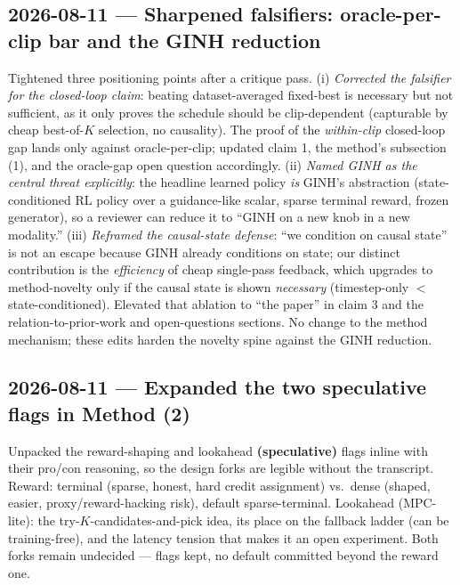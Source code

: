 \documentclass{article}
\begin{document}
\subsection*{2026-08-11 --- Sharpened falsifiers: oracle-per-clip bar and the GINH reduction}
Tightened three positioning points after a critique pass. (i) \emph{Corrected the falsifier for
the closed-loop claim}: beating dataset-averaged fixed-best is necessary but not sufficient, as
it only proves the schedule should be clip-dependent (capturable by cheap best-of-$K$ selection,
no causality). The proof of the \emph{within-clip} closed-loop gap lands only against
oracle-per-clip; updated claim 1, the method's subsection (1), and the oracle-gap open question
accordingly. (ii) \emph{Named GINH as the central threat explicitly}: the headline learned policy
\emph{is} GINH's abstraction (state-conditioned RL policy over a guidance-like scalar, sparse
terminal reward, frozen generator), so a reviewer can reduce it to ``GINH on a new knob in a new
modality.'' (iii) \emph{Reframed the causal-state defense}: ``we condition on causal state'' is
not an escape because GINH already conditions on state; our distinct contribution is the
\emph{efficiency} of cheap single-pass feedback, which upgrades to method-novelty only if the
causal state is shown \emph{necessary} (timestep-only $<$ state-conditioned). Elevated that
ablation to ``the paper'' in claim 3 and the relation-to-prior-work and open-questions sections.
No change to the method mechanism; these edits harden the novelty spine against the GINH
reduction.

\subsection*{2026-08-11 --- Expanded the two speculative flags in Method (2)}
Unpacked the reward-shaping and lookahead \textbf{(speculative)} flags inline with their pro/con
reasoning, so the design forks are legible without the transcript. Reward: terminal (sparse,
honest, hard credit assignment) vs.\ dense (shaped, easier, proxy/reward-hacking risk), default
sparse-terminal. Lookahead (MPC-lite): the try-$K$-candidates-and-pick idea, its place on the
fallback ladder (can be training-free), and the latency tension that makes it an open
experiment. Both forks remain undecided --- flags kept, no default committed beyond the reward
one.
\end{document}

